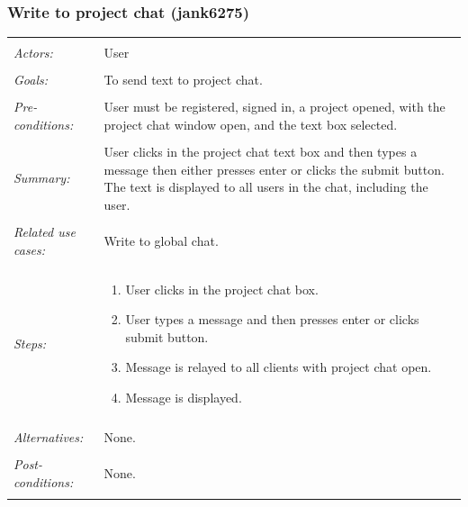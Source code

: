 \documentclass[11pt]{report}
\begin{document}
\subsubsection{Write to project chat (jank6275)}
\begin{tabular}{ p{2cm} p{12cm} }
 \hline
 \\
 \textit{Actors:} & User \\ 
 \\
 \textit{Goals:} & To send text to project chat. \\
 \\
 \textit{Pre-conditions:} & User must be registered, signed in, a project opened, with the project chat window open, and the text box selected.  \\
 \\
 \textit{Summary:} & User clicks in the project chat text box and then types a message then either presses enter or clicks the submit button. The text is displayed to all users in the chat, including the user. \\ 
 \\
 \textit{Related use cases:} & Write to global chat. \\ 
 \\
 \textit{Steps:} & \begin{enumerate}
  \item User clicks in the project chat box.
  \item User types a message and then presses enter or clicks submit button.
  \item Message is relayed to all clients with project chat open.
  \item Message is displayed.
 \end{enumerate} \\
 \\
 \textit{Alternatives:} & None. \\
 \\
 \textit{Post-conditions:} & None. \\
 \\
\hline
\end{tabular}
\end{document}
